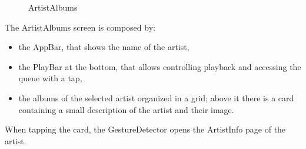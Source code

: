 \documentclass{article}
\begin{document}
\begin{figure}[H]
	\noindent
	\caption{ArtistAlbums}
\end{figure}

The ArtistAlbums screen is composed by:
\begin{itemize}
    \item the AppBar, that shows the name of the artist, 
    \item the PlayBar at the bottom, that allows controlling playback and
        accessing the queue with a tap,
    \item the albums of the selected artist organized in a grid; above it there
        is a card containing a small description of the artist and their image.
\end{itemize}

When tapping the card, the GestureDetector opens the ArtistInfo page of the
artist.
\end{document}
